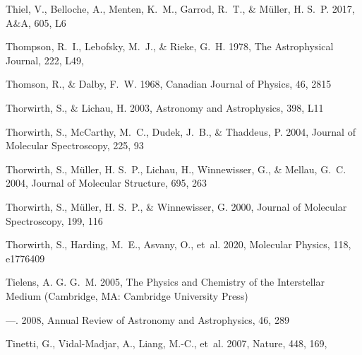 \documentclass[twocolumn]{aastex631}
\begin{document}
\begin{thebibliography}{}
Thiel, V., Belloche, A., Menten, K.~M., Garrod, R.~T., \& M{\"u}ller, H. S.~P.
  2017, A{\&}A, 605, L6

{Thompson}, R.~I., {Lebofsky}, M.~J., \& {Rieke}, G.~H. 1978, The Astrophysical
  Journal, 222, L49, 

Thomson, R., \& Dalby, F.~W. 1968, Canadian Journal of Physics, 46, 2815

Thorwirth, S., \& Lichau, H. 2003, Astronomy and Astrophysics, 398, L11

Thorwirth, S., McCarthy, M.~C., Dudek, J.~B., \& Thaddeus, P.
  2004{}, Journal of Molecular Spectroscopy, 225, 93

Thorwirth, S., M{\"u}ller, H. S.~P., Lichau, H., Winnewisser, G., \& Mellau,
  G.~C. 2004{}, Journal of Molecular Structure, 695, 263

Thorwirth, S., M{\"u}ller, H. S.~P., \& Winnewisser, G. 2000, Journal of
  Molecular Spectroscopy, 199, 116

Thorwirth, S., Harding, M.~E., Asvany, O., {et~al.} 2020, Molecular Physics,
  118, e1776409

Tielens, A. G. G.~M. 2005, {The Physics and Chemistry of the Interstellar
  Medium} (Cambridge, MA: Cambridge University Press)

---. 2008, Annual Review of Astronomy and Astrophysics, 46, 289

{Tinetti}, G., {Vidal-Madjar}, A., {Liang}, M.-C., {et~al.} 2007, Nature, 448,
  169, 


\end{thebibliography}
\end{document}
